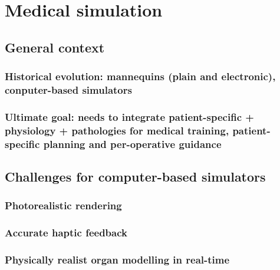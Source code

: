 \chapter{Medical simulation}
\label{chap1}


\section{General context}

	\subsection{Historical evolution: mannequins (plain and electronic), conputer-based simulators}
	\subsection{Ultimate goal: needs to integrate patient-specific + physiology + pathologies for medical training, patient-specific planning and per-operative guidance}
		
\section{Challenges for computer-based simulators}					
	\subsection{Photorealistic rendering}
	\subsection{Accurate haptic feedback}
	\subsection{Physically realist organ modelling in real-time}